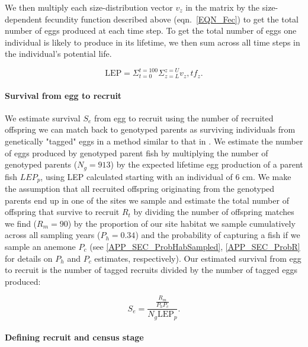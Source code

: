 \documentclass[12pt, oneside]{article}   	%
\begin{document}
We then multiply each size-distribution vector $v_z$ in the matrix by the size-dependent fecundity function described above (eqn.\ \ref{EQN_Fec}) to get the total number of eggs produced at each time step. To get the total number of eggs one individual is likely to produce in its lifetime, we then sum across all time steps in the individual's potential life.  

\begin{equation} %
\text{LEP} = \Sigma_{t=0}^{t=100} \Sigma_{z=L}^{z=U} v_z,t f_z. \label{EQN_LEP}
\end{equation}

\paragraph*{Survival from egg to recruit}

We estimate survival $S_e$ from egg to recruit using the number of recruited offspring we can match back to genotyped parents as surviving individuals from genetically "tagged" eggs in a method similar to that in \cite{johnson2018integrating}. We estimate the number of eggs produced by genotyped parent fish by multiplying the number of genotyped parents ($N_g = 913$) by the expected lifetime egg production of a parent fish $LEP_p$, using LEP calculated starting with an individual of 6 cm. We make the assumption that all recruited offspring originating from the genotyped parents end up in one of the sites we sample and estimate the total number of offspring that survive to recruit $R_t$ by dividing the number of offspring matches we find ($R_m = 90$) by the proportion of our site habitat we sample cumulatively across all sampling years ($P_h = 0.34$) and the probability of capturing a fish if we sample an anemone $P_c$ (see \ref{APP_SEC_ProbHabSampled}, \ref{APP_SEC_ProbR} for details on $P_h$ and $P_c$ estimates, respectively). Our estimated survival from egg to recruit is the number of tagged recruits divided by the number of tagged eggs produced:

\begin{equation}
S_e = \frac{\frac{R_m}{P_h P_c}}{N_g \text{LEP}_p}. \label{EQN_EggRecruitSurv}
\end{equation}

\paragraph*{Defining recruit and census stage} %
\end{document}
